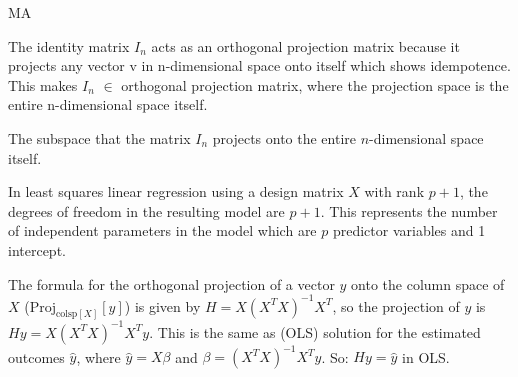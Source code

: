 \documentclass[12pt]{article}
\begin{document}
\begin{enumerate}
MA


The identity matrix $I_n$ acts as an orthogonal projection matrix because it projects any vector v in n-dimensional space onto itself which shows idempotence. This makes $I_n$ $\in$ orthogonal projection matrix, where the projection space is the entire n-dimensional space itself.



The subspace that the matrix \(I_n\) projects onto the entire \(n\)-dimensional space itself.


In least squares linear regression using a design matrix \(X\) with rank \(p + 1\), the degrees of freedom in the resulting model are \(p + 1\). This represents the number of independent parameters in the model which are \(p\) predictor variables and 1 intercept.


The formula for the orthogonal projection of a vector \(y\) onto the column space of \(X\) (\(\text{Proj}_{\text{colsp}[X]}[y]\)) is given by \(H = X(X^TX)^{-1}X^T\), so the projection of \(y\) is \(Hy = X(X^TX)^{-1}X^Ty\). This is the same as (OLS) solution for the estimated outcomes \(\hat{y}\), where \(\hat{y} = X\beta\) and \(\beta = (X^TX)^{-1}X^Ty\). So: \(Hy = \hat{y}\) in OLS.



\end{enumerate}
\end{document}
